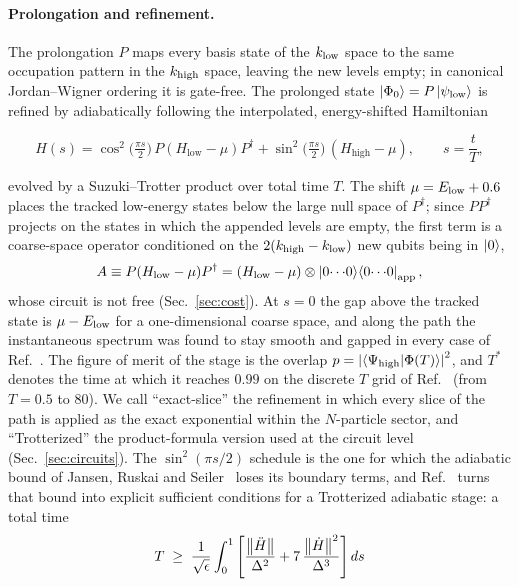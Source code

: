 \documentclass[
  aps,            %
  prc,            %
  reprint,        %
  superscriptaddress,
  floatfix,
  nofootinbib
]{revtex4-2}
\newcommand{\Hlow}{H_{\mathrm{low}}}
\newcommand{\Hhigh}{H_{\mathrm{high}}}
\begin{document}
\paragraph{Prolongation and refinement.}
The prolongation $P$ maps every basis state of the $k_{\rm low}$ space to
the same occupation pattern in the $k_{\rm high}$ space, leaving the new
levels empty; in canonical Jordan--Wigner ordering it is gate-free.  The
prolonged state $\ket{\Phi_0}=P\ket{\psi_{\rm low}}$ is refined by
adiabatically following the interpolated, energy-shifted Hamiltonian
\begin{widetext}
\begin{equation}
  H(s)=\cos^2\!\Big(\tfrac{\pi s}{2}\Big)\,P(\Hlow-\mu)P^\dagger
      +\sin^2\!\Big(\tfrac{\pi s}{2}\Big)\,(\Hhigh-\mu),
  \qquad s=\frac{t}{T},
  \label{eq:path}
\end{equation}
\end{widetext}
evolved by a Suzuki--Trotter product over total time $T$.  The shift
$\mu=E_{\rm low}+0.6$ places the tracked low-energy states below the large
null space of $P^\dagger$; since $PP^\dagger$ projects on the states in which
the appended levels are empty, the first term is a coarse-space operator
conditioned on the $2(k_{\rm high}-k_{\rm low})$ new qubits being in
$\ket0$,
\begin{equation}
  A\equiv P(\Hlow-\mu)P^\dagger=(\Hlow-\mu)\otimes
  \ket{0\!\cdots\!0}\!\bra{0\!\cdots\!0}_{\rm app},
  \label{eq:Aterm}
\end{equation}
whose circuit is not free (Sec.~\ref{sec:cost}).  At $s=0$ the gap above the
tracked state is $\mu-E_{\rm low}$ for a one-dimensional coarse space, and
along the path the instantaneous spectrum was found to stay smooth and
gapped in every case of Ref.~\cite{PairingCompanion}.  The figure of merit
of the stage is the overlap $p=\abs{\braket{\Psi_{\rm high}}{\Phi(T)}}^2$,
and $T^{*}$ denotes the time at which it reaches $0.99$ on the discrete
$T$ grid of Ref.~\cite{PairingCompanion} (from $T=0.5$ to $80$).  We call
``exact-slice'' the refinement in which every slice of the path is applied
as the exact exponential within the $N$-particle sector, and ``Trotterized''
the product-formula version used at the circuit level
(Sec.~\ref{sec:circuits}).  The
$\sin^2(\pi s/2)$ schedule is the one for which the adiabatic bound of
Jansen, Ruskai and Seiler~\cite{Jansen2007} loses its boundary terms, and
Ref.~\cite{Sadia2026} turns that bound into explicit sufficient conditions
for a Trotterized adiabatic stage: a total time
\begin{equation}
  T\;\ge\;\frac{1}{\sqrt{\epsilon}}\int_0^1
  \left[\frac{\norm{\ddot H}}{\Delta^2}+7\,\frac{\norm{\dot H}^2}{\Delta^3}\right]ds
  \label{eq:Tbound}
\end{equation}
\end{document}
